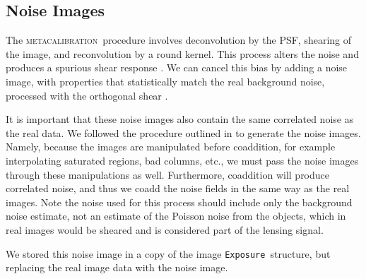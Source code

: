 \documentclass[twocolumn,twocolappendix,astrosym]{openjournal}
\newcommand{\calexp}{\texttt{Exposure}}
\newcommand{\mcal}{\textsc{metacalibration}}
\begin{document}
\subsection{Noise Images} \label{sec:sim:noiseimages}

The \mcal\ procedure involves deconvolution by the PSF, shearing of the image,
and reconvolution by a round kernel.  This process alters the noise and
produces a spurious shear response \citep{SheldonMcal2017}.  We can cancel this
bias by adding a noise image, with properties that statistically match the real
background noise, processed with the orthogonal shear
\citep{SheldonMcal2017,mdet20}.

It is important that these noise images also contain the same correlated noise
as the real data. We followed the procedure outlined in \citet{BeckerMdetCoadd}
to generate the noise images. Namely, because the images are manipulated before
coaddition, for example interpolating saturated regions, bad columns, etc., we
must pass the noise images through these manipulations as well. Furthermore,
coaddition will produce correlated noise, and thus we coadd the noise fields in
the same way as the real images. Note the noise used for this process should
include only the background noise estimate, not an estimate of the Poisson
noise from the objects, which in real images would be sheared and is considered
part of the lensing signal.

We stored this noise image in a copy of the image \calexp\ structure, but
replacing the real image data with the noise image.
\end{document}
